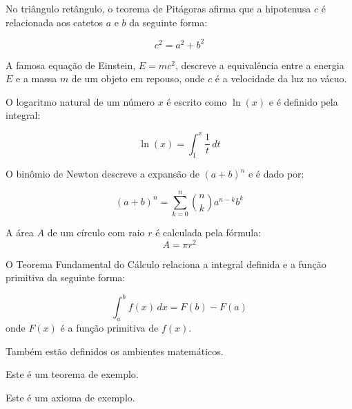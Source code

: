 \documentclass[
	article,			%
	11pt,				%
	oneside,			%
	a4paper,			%
	chapter=TITLE,
	english,			%
	brazil,				%
	sumario=tradicional
	]{templateimtec}
\begin{document}
\begin{exemplo}
	
	
	No triângulo retângulo, o teorema de Pitágoras afirma que a hipotenusa \(c\) é relacionada aos catetos \(a\) e \(b\) da seguinte forma:
	
	\[
		c^2 = a^2 + b^2
	\]
\end{exemplo}

\begin{exemplo}
	A famosa equação de Einstein, \(E=mc^2\), descreve a equivalência entre a energia \(E\) e a massa \(m\) de um objeto em repouso, onde \(c\) é a velocidade da luz no vácuo.
	
\end{exemplo}

\begin{exemplo}
	O logaritmo natural de um número \(x\) é escrito como \(\ln(x)\) e é definido pela integral:
	
	\[
		\ln(x) = \int_{1}^{x} \frac{1}{t} \, dt
	\]
	
\end{exemplo}

\begin{exemplo}
	O binômio de Newton descreve a expansão de \((a + b)^n\) e é dado por:
	
	\[
		(a + b)^n = \sum_{k=0}^{n} \binom{n}{k} a^{n-k} b^k
	\]
\end{exemplo}
   
\begin{exemplo}
	A área \(A\) de um círculo com raio \(r\) é calculada pela fórmula:
	\[
		A = \pi r^2
	\]
\end{exemplo}

\begin{exemplo}
	O Teorema Fundamental do Cálculo relaciona a integral definida e a função primitiva da seguinte forma:
	
	\[
		\int_{a}^{b} f(x) \, dx = F(b) - F(a)
	\]
	onde \(F(x)\) é a função primitiva de \(f(x)\).
	
\end{exemplo}

Também estão definidos os ambientes matemáticos.

\begin{teorema}
	Este é um teorema de exemplo.
\end{teorema}
   
\begin{axioma}
	Este é um axioma de exemplo.
\end{axioma}
   
\end{document}
